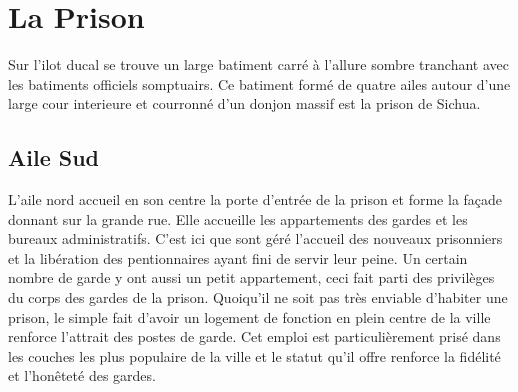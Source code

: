 \section{La Prison}

Sur l'ilot ducal se trouve un large batiment carré à l'allure sombre
tranchant avec les batiments officiels somptuairs. Ce batiment formé
de quatre ailes autour d'une large cour interieure et courronné d'un donjon
massif est la prison de Sichua.

\subsection{Aile Sud}

L'aile nord accueil en son centre la porte d'entrée de la prison et forme 
la façade donnant sur la grande rue. Elle accueille 
les appartements des gardes et les bureaux
administratifs. C'est ici que sont géré l'accueil des nouveaux prisonniers et 
la libération des pentionnaires ayant fini de servir leur
peine. Un certain nombre de garde y ont aussi un petit appartement,
ceci fait parti des privilèges du corps des gardes de la prison. Quoiqu'il
ne soit pas très enviable d'habiter une prison, le simple fait d'avoir 
un logement de fonction en plein centre de la ville renforce l'attrait 
des postes de garde. Cet emploi est particulièrement prisé
dans les couches les plus populaire de la ville et le statut qu'il offre renforce la fidélité
et l'honêteté des gardes.

